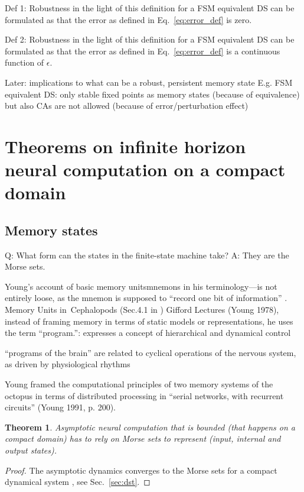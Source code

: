 \documentclass{scrartcl}
\newtheorem{theorem}{Theorem}
\theoremstyle{definition}
\theoremstyle{remark}
\begin{document}
Def 1: Robustness in the light of this definition for a FSM equivalent DS can be formulated as that the error as defined in Eq.~\ref{eq:error_def} is zero.

Def 2: Robustness in the light of this definition for a FSM equivalent DS can be formulated as that the error as defined in Eq.~\ref{eq:error_def} is a continuous function of $\epsilon$.

Later: implications to what can be a robust, persistent memory state
E.g.  FSM equivalent DS: only stable fixed points as memory states (because of equivalence)
but also CAs are not allowed (because of error/perturbation effect)


\section{Theorems on infinite horizon neural computation on a compact domain}\label{sec:theorems}


\subsection{Memory states}%
Q: What form can the states in the finite-state machine take?
A: They are the Morse sets.

Young’s account of basic memory unitsmnemons in his terminology—is not entirely loose, as the mnemon is supposed to “record one bit of information” \citep{young1978}. %
Memory Units in Cephalopods (Sec.4.1 in \citep{milkowski2018})
Gifford Lectures (Young 1978), instead of framing memory in terms of static models or representations, he uses the term “program.”: expresses a concept of hierarchical and dynamical control

“programs of the brain” are related to cyclical operations of the nervous system, as driven by physiological rhythms

Young framed the computational principles of two memory systems of the octopus in terms of distributed processing in “serial networks, with recurrent circuits” (Young 1991, p. 200).

\begin{theorem}
Asymptotic neural computation that is bounded (that happens on a compact domain) has to rely on Morse sets to represent (input, internal and output states).
\end{theorem}

\begin{proof}
The asymptotic dynamics converges to the Morse sets for a compact dynamical system \cite{conley1978}, see Sec.~\ref{sec:dst}.
\end{proof}
\end{document}
